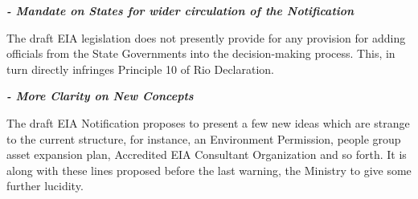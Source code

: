 \begin{multicols}{2}
{\it\bfseries - Mandate on States for wider circulation of the Notification}

\noi
The draft EIA legislation does not presently provide for any provision for adding officials
from the State Governments into the decision-making process. This, in turn directly infringes
Principle 10 of Rio Declaration. 

{\it\bfseries - More Clarity on New Concepts}

\noi
The draft EIA Notification proposes to present a few new ideas which are strange to the
current structure, for instance, an Environment Permission, people group asset expansion
plan, Accredited EIA Consultant Organization and so forth. It is along with these lines
proposed before the last warning, the Ministry to give some further lucidity.

\end{multicols}
\label{end2021-art5}
